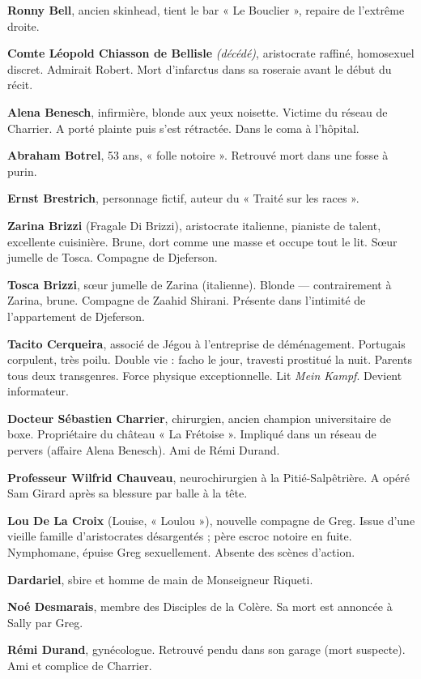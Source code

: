\textbf{Ronny Bell}, ancien skinhead, tient le bar « Le Bouclier », repaire de l'extrême droite.

\textbf{Comte Léopold Chiasson de Bellisle} \emph{(décédé)}, aristocrate raffiné, homosexuel discret. Admirait Robert. Mort d'infarctus dans sa roseraie avant le début du récit.

\textbf{Alena Benesch}, infirmière, blonde aux yeux noisette. Victime du réseau de Charrier. A porté plainte puis s'est rétractée. Dans le coma à l'hôpital.

\textbf{Abraham Botrel}, 53 ans, « folle notoire ». Retrouvé mort dans une fosse à purin.

\textbf{Ernst Brestrich}, personnage fictif, auteur du « Traité sur les races ».

\textbf{Zarina Brizzi} (Fragale Di Brizzi), aristocrate italienne, pianiste de talent, excellente cuisinière. Brune, dort comme une masse et occupe tout le lit. Sœur jumelle de Tosca. Compagne de Djeferson.

\textbf{Tosca Brizzi}, sœur jumelle de Zarina (italienne). Blonde --- contrairement à Zarina, brune. Compagne de Zaahid Shirani. Présente dans l'intimité de l'appartement de Djeferson.

\textbf{Tacito Cerqueira}, associé de Jégou à l'entreprise de déménagement. Portugais corpulent, très poilu. Double vie : facho le jour, travesti prostitué la nuit. Parents tous deux transgenres. Force physique exceptionnelle. Lit \emph{Mein Kampf}. Devient informateur.

\textbf{Docteur Sébastien Charrier}, chirurgien, ancien champion universitaire de boxe. Propriétaire du château « La Frétoise ». Impliqué dans un réseau de pervers (affaire Alena Benesch). Ami de Rémi Durand.

\textbf{Professeur Wilfrid Chauveau}, neurochirurgien à la Pitié-Salpêtrière. A opéré Sam Girard après sa blessure par balle à la tête.

\textbf{Lou De La Croix} (Louise, « Loulou »), nouvelle compagne de Greg. Issue d'une vieille famille d'aristocrates désargentés ; père escroc notoire en fuite. Nymphomane, épuise Greg sexuellement. Absente des scènes d'action.

\textbf{Dardariel}, sbire et homme de main de Monseigneur Riqueti.

\textbf{Noé Desmarais}, membre des Disciples de la Colère. Sa mort est annoncée à Sally par Greg.

\textbf{Rémi Durand}, gynécologue. Retrouvé pendu dans son garage (mort suspecte). Ami et complice de Charrier.

